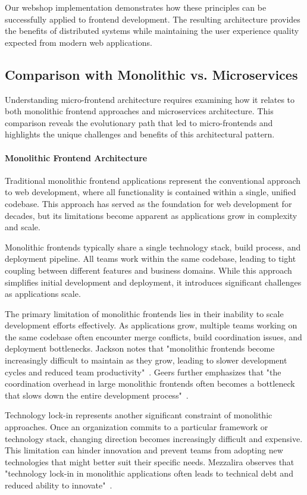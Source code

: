 \documentclass[12pt,a4paper]{report}
\begin{document}
Our webshop implementation demonstrates how these principles can be successfully applied to frontend development. The resulting architecture provides the benefits of distributed systems while maintaining the user experience quality expected from modern web applications.
\subsection{Comparison with Monolithic vs. Microservices}

Understanding micro-frontend architecture requires examining how it relates to both monolithic frontend approaches and microservices architecture. This comparison reveals the evolutionary path that led to micro-frontends and highlights the unique challenges and benefits of this architectural pattern.

\paragraph{Monolithic Frontend Architecture}

Traditional monolithic frontend applications represent the conventional approach to web development, where all functionality is contained within a single, unified codebase. This approach has served as the foundation for web development for decades, but its limitations become apparent as applications grow in complexity and scale.

Monolithic frontends typically share a single technology stack, build process, and deployment pipeline. All teams work within the same codebase, leading to tight coupling between different features and business domains. While this approach simplifies initial development and deployment, it introduces significant challenges as applications scale.

The primary limitation of monolithic frontends lies in their inability to scale development efforts effectively. As applications grow, multiple teams working on the same codebase often encounter merge conflicts, build coordination issues, and deployment bottlenecks. Jackson notes that "monolithic frontends become increasingly difficult to maintain as they grow, leading to slower development cycles and reduced team productivity"~\cite{jackson2016microfrontends}. Geers further emphasizes that "the coordination overhead in large monolithic frontends often becomes a bottleneck that slows down the entire development process"~\cite{geers2019microfrontends}.

Technology lock-in represents another significant constraint of monolithic approaches. Once an organization commits to a particular framework or technology stack, changing direction becomes increasingly difficult and expensive. This limitation can hinder innovation and prevent teams from adopting new technologies that might better suit their specific needs. Mezzalira observes that "technology lock-in in monolithic applications often leads to technical debt and reduced ability to innovate"~\cite{mezzalira2021building}.
\end{document}
